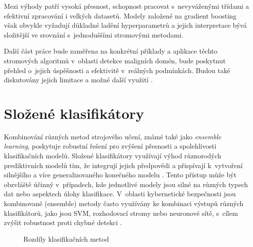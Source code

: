 Mezi výhody patří vysoká přesnost, schopnost pracovat s~nevyváženými třídami a efektivní zpracování i velkých datasetů. Modely založené na gradient boosting však obvykle vyžadují důkladné ladění hyperparametrů a jejich interpretace bývá složitější ve srovnání s~jednoduššími stromovými metodami.


\noindent Další část práce bude zaměřena na konkrétní příklady a aplikace těchto stromových algoritmů v~oblasti detekce maligních domén, bude poskytnut přehled o~jejich úspěšnosti a efektivitě v~reálných podmínkách. Budou také diskutovány jejich limitace a možné další využití \cite{silveira2021detection, zou2019detecting}.


\section{Složené klasifikátory}

Kombinování různých metod strojového učení, známé také jako \textit{ensemble learning}, poskytuje robustní řešení pro zvýšení přesnosti a spolehlivosti klasifikačních modelů. Složené klasifikátory využívají výhod různorodých prediktivních modelů tím, že integrují jejich předpovědi a přispívají k~vytvoření silnějšího a více generalizovaného konečného modelu \cite{dietterich2000ensemble, wolpert1992stacking}. Tento přístup může být obzvláště účinný v~případech, kde jednotlivé modely jsou silné na různých typech dat nebo aspektech úlohy klasifikace. V~oblasti kybernetické bezpečnosti jsou kombinované (ensemble) metody často využívány ke kombinaci výstupů různých klasifikátorů, jako jsou SVM, rozhodovací stromy nebo neuronové sítě, s~cílem zvýšit robustnost proti chybné detekci \cite{bai2015bayesian}.


\begin{figure}[h!]
  \begin{center}
  \caption{Rozdíly klasifikačních metod}
  \end{center}\label{chart:weighted}
\end{figure}


